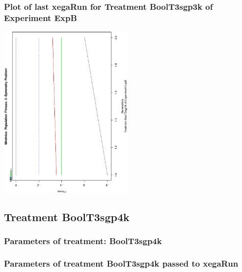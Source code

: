 \documentclass[18pt,c]{beamer}
\makeatletter
\def\beamer@writeslidentry@miniframesoff{%
  \expandafter\beamer@ifempty\expandafter{\beamer@framestartpage}{}%
  {%
   \clearpage\beamer@notesactions%
  }
}
\newcommand*{\miniframesoff}{\let\beamer@writeslidentry=\beamer@writeslidentry@miniframesoff}
\makeatother
\begin{document}
 \begin{frame}
 \frametitle{ Plot of last xegaRun for Treatment BoolT3sgp3k of Experiment ExpB }
 \begin{center}
\includegraphics[width=0.5\textwidth, angle=-90]
{ExpBPlotPopStatsFigure016.eps}
 \end{center}
 \label{report/ExpBPlotPopStatsFigure016.eps}  
 \end{frame}

\miniframesoff
\subsection{Treatment BoolT3sgp4k}

 \begin{frame}
 \fontsize{8pt}{9pt}\selectfont
 \frametitle{  Parameters of treatment: BoolT3sgp4k 
 }

 \label{ExpBtParmTable068.tex}  
 \end{frame}


 \begin{frame}
 \fontsize{8pt}{9pt}\selectfont
 \frametitle{  Parameters of treatment BoolT3sgp4k passed to xegaRun
 }

 \label{ExpBtParmTable069.tex}  
 \end{frame}
\end{document}
